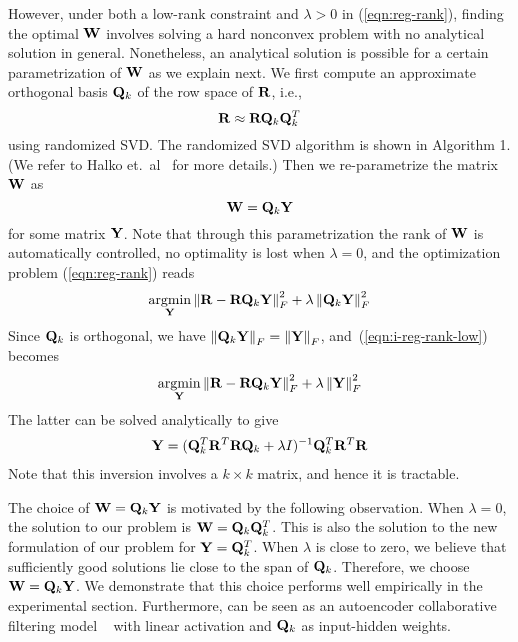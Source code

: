%



However, under both a low-rank constraint and $\lambda > 0$ in (\ref{eqn:reg-rank}), finding the optimal $\mathbf{W}$ involves solving a hard nonconvex problem with no analytical solution in general. Nonetheless, an analytical solution is possible for a certain parametrization of $\mathbf{W}$ as we explain next. We first compute an approximate orthogonal basis $\mathbf{Q}_k$ of the row space of $\mathbf{R}$, i.e.,
\begin{equation}
\mathbf{R} \approx \mathbf{R} \mathbf{Q}_k \mathbf{Q}_k^T
\end{equation}
using randomized SVD. The randomized SVD algorithm is shown in Algorithm 1. (We refer to Halko et.~al~\citep{halko2011} for more details.)
Then we re-parametrize the matrix $\mathbf{W}$ as
\begin{equation}
\mathbf{W} = \mathbf{Q}_k \mathbf{Y}
\end{equation}
for some matrix $\mathbf{Y}$. Note that through this parametrization the rank of $\mathbf{W}$ is automatically controlled, no optimality is lost when $\lambda=0$, and the optimization problem (\ref{eqn:reg-rank}) reads
\begin{align}
\label{eqn:i-reg-rank-low}
\underset{\mathbf{Y}} {\mathrm{argmin}}  \left \| \mathbf{R} - \mathbf{R} \mathbf{Q}_k \mathbf{Y} \right \|_F^2 + \lambda \left \|  \mathbf{Q}_k \mathbf{Y} \right \|_F^2
\end{align}
Since $\mathbf{Q}_k$ is orthogonal, we have $\left \| \mathbf{Q}_k \mathbf{Y} \right \|_F = \left \|\mathbf{Y}\right \|_F$, and~(\ref{eqn:i-reg-rank-low}) becomes
\begin{align}
\underset{\mathbf{Y}}{\mathrm{argmin}} \left \| \mathbf{R} - \mathbf{R}\mathbf{Q}_k\mathbf{Y}\right \|_F^2 + \lambda \left \|  \mathbf{Y} \right \|_F^2
\end{align}
The latter can be solved analytically to give
\begin{align*}
\mathbf{Y} = (\mathbf{Q}_k^T \mathbf{R}^T\mathbf{R}\mathbf{Q}_k +\lambda I)^{-1} \mathbf{Q}_k^T \mathbf{R}^T \mathbf{R}
\end{align*}
Note that this inversion involves a $k \times k$ matrix, and hence it is tractable.


The choice of $\mathbf{W} = \mathbf{Q}_k \mathbf{Y}$ is motivated by the following observation. When $\lambda = 0$, the solution to our problem is $\mathbf{W} = \mathbf{Q}_k \mathbf{Q}_k^T$. This is also the solution to the new formulation of our problem for $\mathbf{Y} = \mathbf{Q}_k^T$. When $\lambda$ is close to zero, we believe that sufficiently good solutions lie close to the span of $\mathbf{Q}_k$. Therefore, we choose $\mathbf{W} = \mathbf{Q}_k \mathbf{Y}$. We demonstrate that this choice performs well empirically in the experimental section. Furthermore, \LinearLow can be seen as an autoencoder collaborative filtering model ~\cite{Sedhain:2015} with linear activation and $\mathbf{Q}_k$ as input-hidden weights.

